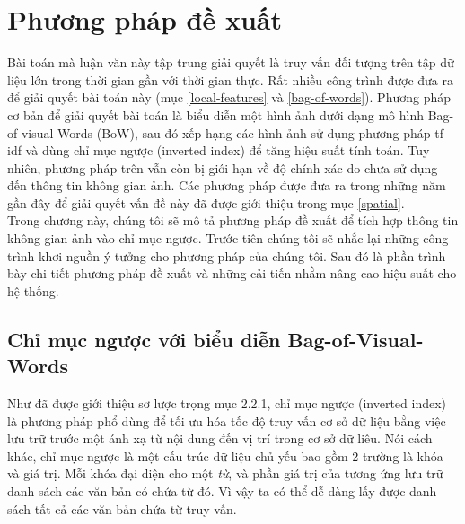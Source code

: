 \chapter{Phương pháp đề xuất}
\label{chapter:proposed}
\ifpdf
    \graphicspath{{Chapter3/Chapter3Figs/PNG/}{Chapter3/Chapter3Figs/PDF/}{Chapter3/Chapter3Figs/}}
\else
    \graphicspath{{Chapter3/Chapter3Figs/EPS/}{Chapter3/Chapter3Figs/}}
\fi


Bài toán mà luận văn này tập trung giải quyết là truy vấn đối tượng trên tập dữ liệu lớn trong thời gian gần với thời gian thực. Rất nhiều công trình được đưa ra để giải quyết bài toán này (mục \ref{local-features} và \ref{bag-of-words}). Phương pháp cơ bản để giải quyết bài toán là biểu diễn một hình ảnh dưới dạng mô hình Bag-of-visual-Words (BoW), sau đó xếp hạng các hình ảnh sử dụng phương pháp tf-idf và dùng chỉ mục ngược (inverted index) để tăng hiệu suất tính toán. Tuy nhiên, phương pháp trên vẫn còn bị giới hạn về độ chính xác do chưa sử dụng đến thông tin không gian ảnh. Các phương pháp được đưa ra trong những năm gần đây để giải quyết vấn đề này đã được giới thiệu trong mục \ref{spatial}.\\

Trong chương này, chúng tôi sẽ mô tả phương pháp đề xuất để tích hợp thông tin không gian ảnh vào chỉ mục ngược. Trước tiên chúng tôi sẽ nhắc lại những công trình khơi nguồn ý tưởng cho phương pháp của chúng tôi. Sau đó là phần trình bày chi tiết phương pháp đề xuất và những cải tiến nhằm nâng cao hiệu suất cho hệ thống.

\section{Chỉ mục ngược với biểu diễn Bag-of-Visual-Words}
\label{sec:inverted-index}
Như đã được giới thiệu sơ lược trọng mục 2.2.1, chỉ mục ngược (inverted index) là phương pháp phổ dùng để tối ưu hóa tốc độ truy vấn cơ sở dữ liệu bằng việc lưu trữ trước một ánh xạ từ nội dung đến vị trí trong cơ sở dữ liêu. Nói cách khác, chỉ mục ngược là một cấu trúc dữ liệu chủ yếu bao gồm 2 trường là khóa và giá trị. Mỗi khóa đại diện cho một \textit{từ}, và phần giá trị của tương ứng lưu trữ danh sách các văn bản có chứa từ đó. Vì vậy ta có thể dễ dàng lấy được danh sách tất cả các văn bản chứa từ truy vấn.

